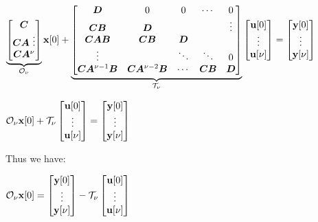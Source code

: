 \documentclass[11pt]{article}
\begin{document}
  \(\underbrace{\begin{bmatrix}
    \bm{C} \\
    \bm{C}\bm{A} \
    \vdots \\
    \bm{C}\bm{A}^{\nu}
  \end{bmatrix}}_{\mathcal{O}_\nu}\mathbf{x}[0] +
  \underbrace{\begin{bmatrix}
    \bm{D} & 0 & 0 & \cdots & 0\\
    \bm{C}\bm{B} & \bm{D} & & & \vdots \\
    \bm{C}\bm{A}\bm{B} & \bm{C}\bm{B} & \bm{D} \\
    \vdots & & \ddots & \ddots & 0 \\
    \bm{C}\bm{A}^{\nu - 1}\bm{B} & \bm{C}\bm{A}^{\nu - 2}\bm{B} & \cdots &
    \bm{CB} & \bm{D}
  \end{bmatrix}}_{\mathcal{T}_{\nu}}
  \begin{bmatrix}
    \mathbf{u}[0] \\
    \vdots \\
    \mathbf{u}[\nu]
  \end{bmatrix} =
  \begin{bmatrix}
    \mathbf{y}[0] \\
    \vdots \\
    \mathbf{y}[\nu] \\
  \end{bmatrix}\)

  \(\mathcal{O}_{\nu}\mathbf{x}[0] +
  \mathcal{T}_{\nu}
  \begin{bmatrix}
    \mathbf{u}[0] \\
    \vdots \\
    \mathbf{u}[\nu]
  \end{bmatrix} =
  \begin{bmatrix}
    \mathbf{y}[0] \\
    \vdots \\
    \mathbf{y}[\nu] \\
  \end{bmatrix}\)

  Thus we have:

  \(\mathcal{O}_{\nu}\mathbf{x}[0] =
  \begin{bmatrix}
    \mathbf{y}[0] \\
    \vdots \\
    \mathbf{y}[\nu] \\
  \end{bmatrix} -
  \mathcal{T}_{\nu}
  \begin{bmatrix}
    \mathbf{u}[0] \\
    \vdots \\
    \mathbf{u}[\nu]
  \end{bmatrix}\)
\end{document}
